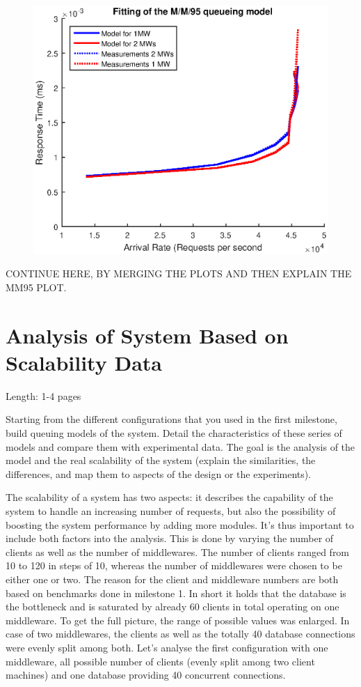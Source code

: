 \documentclass[11pt]{article}
\begin{document}
\begin{figure}
\centering
\includegraphics[width=0.7\linewidth]{figures/middleware/mm95}
\caption{}
\label{fig:mm95}
\end{figure}

CONTINUE HERE, BY MERGING THE PLOTS AND THEN EXPLAIN THE MM95 PLOT.


\section{Analysis of System Based on Scalability Data}\label{sec:analysis-scalability}

Length: 1-4 pages

Starting from the different configurations that you used in the first milestone, build queuing models of the system. Detail the characteristics of these series of models and compare them with experimental data. The goal is the analysis of the model and the real scalability of the system (explain the similarities, the 
differences, and map them to aspects of the design or the experiments).

The scalability of a system has two aspects: it describes the capability of the system to handle an increasing number of requests, but also the possibility of boosting the system performance by adding more modules. It's thus important to include both factors into the analysis. This is done by varying the number of clients as well as the number of middlewares. The number of clients ranged from 10 to 120 in steps of 10, whereas the number of middlewares were chosen to be either one or two. The reason for the client and middleware numbers are both based on benchmarks done in milestone 1. In short it holds that the database is the bottleneck and is saturated by already 60 clients in total operating on one middleware. To get the full picture, the range of possible values was enlarged. In case of two middlewares, the clients as well as the totally 40 database connections were evenly split among both. Let's analyse the first configuration with one middleware, all possible number of clients (evenly split among two client machines) and one database providing 40 concurrent connections.
\end{document}
